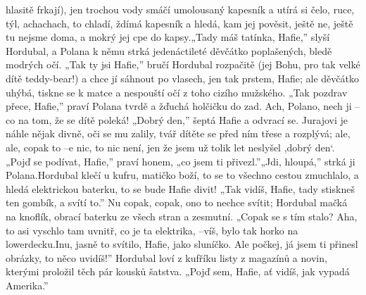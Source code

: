 \documentclass[11pt]{article}
\begin{document}
    hlasitě  frkají),  jen  trochou  vody  smáčí  umolousaný  kapesník  a  utírá  si  čelo,  ruce,  týl, achachach, to chladí, ždímá kapesník a hledá, kam jej pověsit, ještě ne, ještě tu nejsme doma, a mokrý jej cpe do kapsy.„Tady máš tatínka, Hafie,” slyší Hordubal, a Polana k němu strká jedenáctileté děvčátko poplašených, bledě modrých očí. „Tak ty jsi Hafie,” bručí Hordubal rozpačitě (jej Bohu, pro tak velké dítě teddy-bear!) a chce jí sáhnout po vlasech, jen tak prstem, Hafie; ale děvčátko uhýbá, tiskne se k matce a nespouští očí z toho cizího mužského. „Tak pozdrav přece, Hafie,” praví Polana tvrdě a žďuchá holčičku do zad. Ach, Polano, nech ji –co na tom, že se dítě poleká! „Dobrý den,” šeptá Hafie a odvrací se. Jurajovi je náhle nějak divně, oči se mu zalily, tvář dítěte se před ním třese a rozplývá; ale, ale, copak to –e nic, to nic není, jen že jsem už tolik let neslyšel ,dobrý den‘. „Pojď se podívat, Hafie,” praví honem, „co jsem ti přivezl.”„Jdi, hloupá,” strká ji Polana.Hordubal  klečí  u  kufru,  matičko  boží,  to  se  to  všechno  cestou  zmuchlalo,  a  hledá elektrickou baterku, to se bude Hafie divit! „Tak vidíš, Hafie, tady stiskneš ten gombík, a svítí to.” Nu copak, copak, ono to nechce svítit; Hordubal mačká na knoflík, obrací baterku ze všech stran a zesmutní. „Copak se s tím stalo? Aha, to asi vyschlo tam uvnitř, co je ta elektrika, –víš, bylo tak horko na lowerdecku.Inu, jasně to svítilo, Hafie, jako sluníčko. Ale počkej, já jsem ti přinesl obrázky, to něco uvidíš!” Hordubal loví z kufříku listy z magazínů a novin,  kterými  proložil  těch  pár  kousků šatstva. „Pojď  sem,  Hafie,  ať  vidíš,  jak  vypadá Amerika.”
\end{document}
